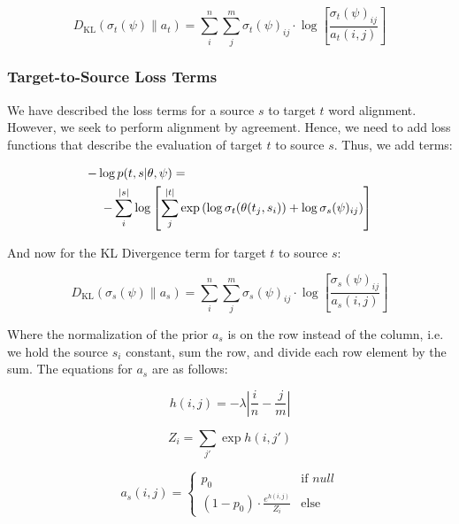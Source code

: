 \documentclass[twoside,twocolumn]{article}
\begin{document}
\begin{equation}
  D_{\mathrm{KL}}(\sigma_t(\psi) \| a_t) =
    \sum_i^n \sum_j^m \sigma_t(\psi)_{ij} \cdot
      \log \left[ \frac{\sigma_t(\psi)_{ij}}{a_t(i, j)} \right]
\end{equation}


\subsubsection{Target-to-Source Loss Terms}

We have described the loss terms for a source $s$ to target $t$ word alignment.
However, we seek to perform alignment by agreement. Hence, we need to add loss
functions that describe the evaluation of target $t$ to source $s$. Thus, we
add terms:

\begin{equation}
  \centering
  \begin{split}
  -\log  p(t & , s | \theta, \psi) = \\
  - \sum_i^{|s|} & \log \left[ \sum_j^{|t|}
      \exp \left(
        \log \sigma_t(\theta(t_j, s_i)) + \log \sigma_s(\psi)_{ij}
      \right)
    \right]
\end{split}
\end{equation}

And now for the KL Divergence term for target $t$ to source $s$:

\begin{equation}
D_{\mathrm{KL}} (\sigma_s(\psi) \| a_s) = \sum_i^n \sum_j^m \sigma_s(\psi)_{ij}
  \cdot \log \left[ \frac{\sigma_s(\psi)_{ij}}{a_s(i, j)} \right]
\end{equation}

Where the normalization of the prior $a_s$ is on the row instead of the column, i.e. we hold the source $s_i$ constant, sum the row, and divide each row element by the sum. The equations for $a_s$ are as follows:

\begin{equation}
  h(i, j) = {-\lambda \left| \frac{i}{n} - \frac{j}{m}\right|}
\end{equation}

\begin{equation}
  Z_i = \sum_{j'} \exp h(i, j')
\end{equation}

\begin{equation}
a_s (i, j) =
\begin{cases}
      p_0 & \text{if } null \\
     (1-p_0) \cdot \frac{e^{h(i,j)}}{Z_i} & \text{else}
   \end{cases}
\end{equation}
\end{document}
